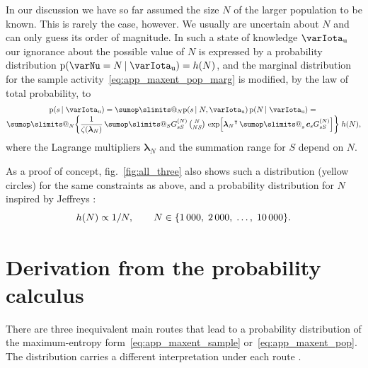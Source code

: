 \documentclass[\ifafour a4paper,12pt,\else a5paper,10pt,\fi%
onecolumn,oneside,article,%
british%
]{memoir}
\makeatletter
\theoremstyle{remark}
\theoremstyle{innote}
\def\sum{\DOTSI\sumop\slimits@}
\newcommand*{\citep}{\parencites}
\DeclarePairedDelimiter\set{\{}{\}}
\newcommand*{\pf}{\mathrm{p}}%
\renewcommand*{\|}{\nonscript\,\vert\nonscript\;\mathopen{}}
\newcommand*{\sect}{\S}%
\newcommand*{\fig}{fig.}%
\newcommand*{\tsum}{\mathop{\textstyle\sum}\nolimits}
\newcommand*{\T}{^\intercal}%
\newcommand*{\ypp}{G}
\newcommand*{\yRv}{S}
\newcommand*{\yrv}{s}
\newcommand*{\yNv}{N}
\newcommand*{\yNN}{\varNu}
\newcommand*{\yrs}{\yrv}%
\newcommand*{\yRf}{\yRv}%
\newcommand*{\yHd}{\varIota_\textrm{u}}
\newcommand*{\yg}{\bm{c}}
\newcommand*{\yL}{\bm{\lambda}}
\newcommand*{\yK}{\zeta}
\makeatother
\begin{document}
\bigskip

In our discussion we have so far assumed the size $\yNv$ of the larger
population to be known. This is rarely the case, however. We usually are
uncertain about $\yNv$ and can only guess its order of magnitude. In such a
state of knowledge $\yHd$ our ignorance about the possible value of $\yNv$
is expressed by a probability distribution $\pf(\yNN=\yNv \|\yHd)=h(\yNv)$,
and the marginal distribution for the sample
activity~\eqref{eq:app_maxent_pop_marg} is modified, by the law of total
probability, to
\begin{multline}
  \label{eq:app_maxent_pop_marg_unknown_N}
  \pf(\yrs \| \yHd)  =
  \sum_{\yNv} \pf(\yrs \| \yNv,\yHd) \,
  \pf(\yNv \|\yHd)
  ={}\\[-\jot]
  \sum_\yNv \biggl\{\frac{1}{\yK(\yL_\yNv)}\, 
  \sum_{\yRf} \ypp^{(\yNv)}_{\yrs\yRf}
\,
  \tbinom{\yNv}{\yNv \yRf}\,\exp\Bigl[{\yL_\yNv}\T
  \tsum_{\yrs} \yg_{\yrs}\ypp^{(\yNv)}_{\yrs\yRf}\Bigr]\biggr\}
  \;h(\yNv),
\end{multline}
where the Lagrange multipliers $\yL_{\yNv}$ and the summation range for
$\yRf$ depend on $\yNv$.

As a proof of concept, \fig~\ref{fig:all_three} also shows such a distribution
(yellow circles) for the same constraints as above, and a probability
distribution for $\yNv$ inspired by Jeffreys
\citep[\sect~4.8]{jeffreys1939_r1983}:
\begin{equation}
  \label{eq:pdf_popsize}
  h(\yNv) \propto 1/\yNv, \qquad
  \yNv \in\set{1\,000,\; 2\,000,\; \dotsc,\;10\,000}.
\end{equation}

\section{Derivation from the probability calculus}
\label{sec:derivation_prob_calculus}

There are three inequivalent main routes that lead to a probability
distribution of the maximum-entropy form~\eqref{eq:app_maxent_sample}
or~\eqref{eq:app_maxent_pop}. The distribution carries a different
interpretation under each route \citep[pp.~52--55,
72--77]{jaynes1979b}[pp.~25--28]{jaynes1982}[\sect~I]{jaynes1982b}{jaynes1986d_r1996}[\sect~11.1]{jaynes1994_r2003}.
\end{document}
